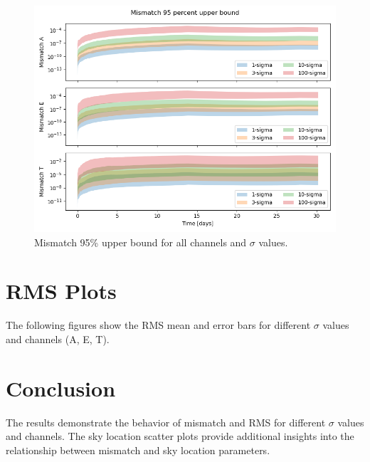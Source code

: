 \documentclass[a4paper,12pt]{article}
\begin{document}
\begin{figure}
    \centering
    \includegraphics[width=\textwidth]{results/mismatch_upper95_tdi_deviation_A1.084702251e-22_f0.01_fdot1.47197271e-17.png}
    \caption{Mismatch 95\% upper bound for all channels and $\sigma$ values.}
    \label{fig:mismatch_upper95_1e-2}
\end{figure}
\newpage

\section{RMS Plots}
The following figures show the RMS mean and error bars for different $\sigma$ values and channels (A, E, T).


\section{Conclusion}
The results demonstrate the behavior of mismatch and RMS for different $\sigma$ values and channels. The sky location scatter plots provide additional insights into the relationship between mismatch and sky location parameters.
\end{document}

